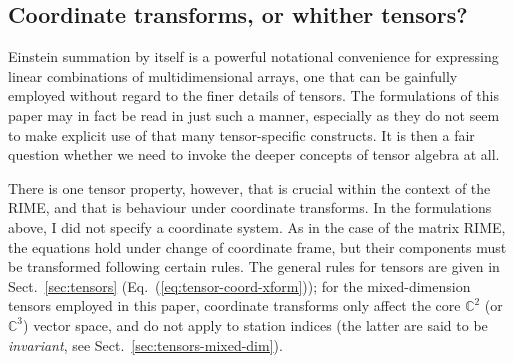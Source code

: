 \documentclass[]{aa}
\newcommand{\DD}[1]{\,\mathrm{d}{#1}}
\begin{document}
% 
% 
% 
% 
% 

\subsection{Coordinate transforms, or whither tensors?}

Einstein summation by itself is a powerful notational convenience for expressing linear combinations of multidimensional arrays, one that can be gainfully employed without regard to the finer details of tensors. The formulations of this paper may in fact be read in just such a manner, especially as they do not seem to make explicit use of that many tensor-specific constructs. It is then a fair question whether we need to invoke the deeper concepts of tensor algebra at all.

There is one tensor property, however, that is crucial within the context of the RIME, and that is behaviour under coordinate transforms. In the formulations above, I did not specify a coordinate system. As in the case of the matrix RIME, the equations hold under change of coordinate frame, but their components must be transformed following certain rules. The general rules for tensors are given in Sect.~\ref{sec:tensors} (Eq.~(\ref{eq:tensor-coord-xform})); for the mixed-dimension tensors employed in this paper, coordinate transforms only affect the core $\mathbb{C}^2$ (or $\mathbb{C}^3$) vector space, and do not apply to station indices (the latter are said to be \emph{invariant}, see Sect.~\ref{sec:tensors-mixed-dim}).
\end{document}
